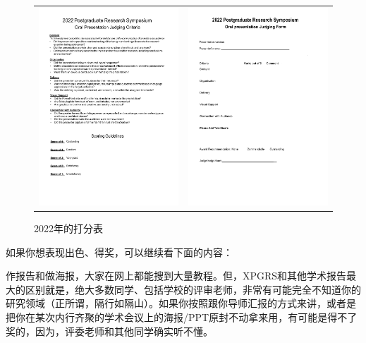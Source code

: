 \begin{figure}[H]
    \caption{2022年的打分表}
    \centering
    \begin{tabular}{rl}
        \includegraphics[width=0.5\columnwidth]{author-folder/Kai.Wu/2022_XPGRS_oral_judging_criteria.pdf} & 
        \includegraphics[width=0.5\columnwidth]{author-folder/Kai.Wu/2022_XPGRS_oral_judging_form.pdf} 
    \end{tabular}
\end{figure}

如果你想表现出色、得奖，可以继续看下面的内容：

作报告和做海报，大家在网上都能搜到大量教程。但，XPGRS和其他学术报告最大的区别就是，绝大多数同学、包括学校的评审老师，非常有可能完全不知道你的研究领域（正所谓，隔行如隔山）。如果你按照跟你导师汇报的方式来讲，或者是把你在某次内行齐聚的学术会议上的海报/PPT原封不动拿来用，有可能是得不了奖的，因为，评委老师和其他同学确实听不懂。

